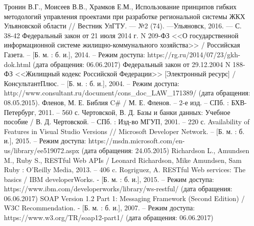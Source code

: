 \begin{thebibliography}{99}
	 Тронин В.Г., Моисеев В.В., Храмков Е.М., Использование принципов гибких методологий управления проектами при разработке региональной системы ЖКХ Ульяновской области // Вестник УлГТУ. — №2 (74). —Ульяновск, 2016. — С. 38-42
	 Федеральный закон от 21 июля 2014 г. N 209-ФЗ <<О государственной информационной системе жилищно-коммунального хозяйства>> / Российская Газета. – [Б. м. : б. и.], 2014. – Режим доступа: https://rg.ru/2014/07/23/gkh-dok.html (дата обращения: 06.06.2017)
	 Федеральный закон от 29.12.2004 N 188-ФЗ <<Жилищный кодекс Российской Федерации>> [Электронный ресурс] / КонсультантПлюс. – [Б. м. : б. и.], 2004. – Режим доступа: http://www.consultant.ru/document/cons\_doc\_LAW\_171389/ (дата обращения: 08.05.2015).
	 Фленов, М. Е. Библия C\# / М. Е. Фленов. – 2-е изд. – СПб. : БХВ-Петербург, 2011. – 560 с.
	 Чертовской, В. Д. Базы и банки данных: Учебное пособие / В. Д. Чертовской. – СПб. : Изд-во МГУП, 2001. –  220 с.
	 Availability of Features in Visual Studio Versions // Microsoft Developer Network. – [Б. м. : б. и.], 2015. – Режим доступа: https://msdn.microsoft.com/en-us/library/ee519072.aspx (дата обращения: 24.05.2015)
	 Richardson L., Amundsen M., Ruby S., RESTful Web APIs / Leonard Richardson, Mike Amundsen, Sam Ruby : O'Reilly Media, 2013. – 406 c.
	 Rogriguez, A. RESTful Web services: The basics / IBM developerWorks. - [Б. м. : б. и.], 2015. – Режим доступа: https://www.ibm.com/developerworks/library/ws-restful/ (дата обращения: 06.06.2017)
	 SOAP Version 1.2 Part 1: Messaging Framework (Second Edition) / W3C Recommendation. - [Б. м. : б. и.], 2007. – Режим доступа: https://www.w3.org/TR/soap12-part1/ (дата обращения: 06.06.2017)
\end{thebibliography}


\clearpage
\newpage